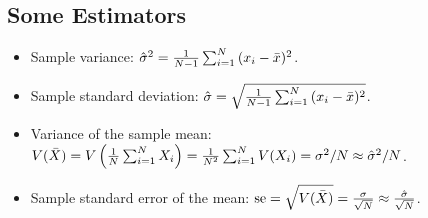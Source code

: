     \subsection{Some Estimators}
        \begin{itemize}
            \item Sample variance: $\hat{\sigma}^2 = \frac{1}{N-1} \sum_{i=1}^{N}{(x_i - \bar{x})^2}$.
            \item Sample standard deviation: $\hat{\sigma} = \sqrt{\frac{1}{N-1} \sum_{i=1}^{N}{(x_i - \bar{x})^2}}$.
            \item Variance of the sample mean: $V(\bar{X}) = V\left( \frac{1}{N}\sum_{i=1}^{N}{X_i} \right) = \frac{1}{N^2}\sum_{i=1}^{N}{V(X_i)} = \sigma^2 / N \approx \hat{\sigma}^2 / N$.
            \item Sample standard error of the mean: $\text{se} = \sqrt{V(\bar{X})} =  \frac{\sigma}{\sqrt{N}} \approx \frac{\hat{\sigma}}{\sqrt{N}}$.
        \end{itemize}

